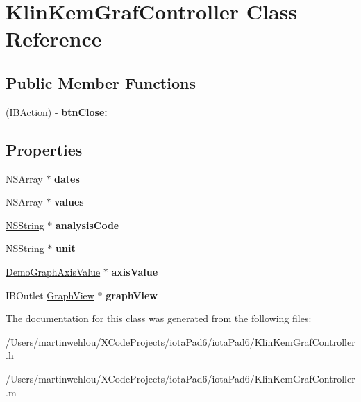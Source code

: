 \hypertarget{interface_klin_kem_graf_controller}{
\section{KlinKemGrafController Class Reference}
\label{interface_klin_kem_graf_controller}
}
\subsection*{Public Member Functions}
\begin{DoxyCompactItemize}
\item 
\hypertarget{interface_klin_kem_graf_controller_af77d335ec2784ce9a145151dc12fc214}{
(IBAction) -\/ {\bfseries btnClose:}}
\label{interface_klin_kem_graf_controller_af77d335ec2784ce9a145151dc12fc214}

\end{DoxyCompactItemize}
\subsection*{Properties}
\begin{DoxyCompactItemize}
\item 
\hypertarget{interface_klin_kem_graf_controller_a2ee7ed4aa570f302890f26d05d410cce}{
NSArray $\ast$ {\bfseries dates}}
\label{interface_klin_kem_graf_controller_a2ee7ed4aa570f302890f26d05d410cce}

\item 
\hypertarget{interface_klin_kem_graf_controller_aa687a2a8b7c70d815015713c917286e2}{
NSArray $\ast$ {\bfseries values}}
\label{interface_klin_kem_graf_controller_aa687a2a8b7c70d815015713c917286e2}

\item 
\hypertarget{interface_klin_kem_graf_controller_aae3b74e5446c64569e400f5929a3ab36}{
\hyperlink{class_n_s_string}{NSString} $\ast$ {\bfseries analysisCode}}
\label{interface_klin_kem_graf_controller_aae3b74e5446c64569e400f5929a3ab36}

\item 
\hypertarget{interface_klin_kem_graf_controller_a1d729f2c647d4623607cc480671a023e}{
\hyperlink{class_n_s_string}{NSString} $\ast$ {\bfseries unit}}
\label{interface_klin_kem_graf_controller_a1d729f2c647d4623607cc480671a023e}

\item 
\hypertarget{interface_klin_kem_graf_controller_a6552ae3fc81c8b7d0ea1b9809e03ba87}{
\hyperlink{interface_demo_graph_axis_value}{DemoGraphAxisValue} $\ast$ {\bfseries axisValue}}
\label{interface_klin_kem_graf_controller_a6552ae3fc81c8b7d0ea1b9809e03ba87}

\item 
\hypertarget{interface_klin_kem_graf_controller_a7abe00cd15c9275c5888e9f996c2fa82}{
IBOutlet \hyperlink{interface_graph_view}{GraphView} $\ast$ {\bfseries graphView}}
\label{interface_klin_kem_graf_controller_a7abe00cd15c9275c5888e9f996c2fa82}

\end{DoxyCompactItemize}


The documentation for this class was generated from the following files:\begin{DoxyCompactItemize}
\item 
/Users/martinwehlou/XCodeProjects/iotaPad6/iotaPad6/KlinKemGrafController.h\item 
/Users/martinwehlou/XCodeProjects/iotaPad6/iotaPad6/KlinKemGrafController.m\end{DoxyCompactItemize}
